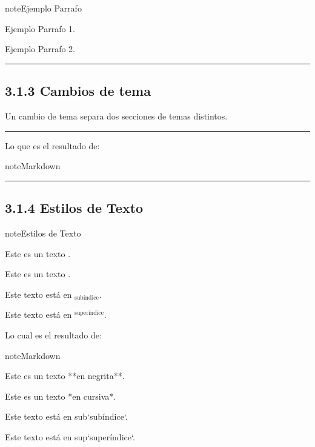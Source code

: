 \documentclass[a4paper,10pt,spanish]{sphinxmanual}
\begin{document}
\begin{sphinxadmonition}{note}{Ejemplo Parrafo}

\sphinxAtStartPar
Ejemplo Parrafo 1.

\sphinxAtStartPar
Ejemplo Parrafo 2.
\end{sphinxadmonition}


\bigskip\hrule\bigskip



\subsection{3.1.3 Cambios de tema}
\label{\detokenize{3_guia_myst/tipografia:cambios-de-tema}}
\sphinxAtStartPar
Un cambio de tema separa dos secciones de temas distintos.


\bigskip\hrule\bigskip


\sphinxAtStartPar
Lo que es el resultado de:

\begin{sphinxadmonition}{note}{Markdown}

\begin{sphinxVerbatim}[commandchars=\\\{\}]
\end{sphinxVerbatim}
\end{sphinxadmonition}


\bigskip\hrule\bigskip



\subsection{3.1.4 Estilos de Texto}
\label{\detokenize{3_guia_myst/tipografia:estilos-de-texto}}
\begin{sphinxadmonition}{note}{Estilos de Texto}

\sphinxAtStartPar
Este es un texto .

\sphinxAtStartPar
Este es un texto .

\sphinxAtStartPar
Este texto está en $_{\text{subíndice}}$.

\sphinxAtStartPar
Este texto está en $^{\text{superíndice}}$.
\end{sphinxadmonition}

\sphinxAtStartPar
Lo cual es el resultado de:

\begin{sphinxadmonition}{note}{Markdown}

\begin{sphinxVerbatim}[commandchars=\\\{\}]
Este es un texto **en negrita**.

Este es un texto *en cursiva*.

Este texto está en \PYGZob{}sub\PYGZcb{}`subíndice`.

Este texto está en \PYGZob{}sup\PYGZcb{}`superíndice`.
\end{sphinxVerbatim}
\end{sphinxadmonition}
\end{document}
